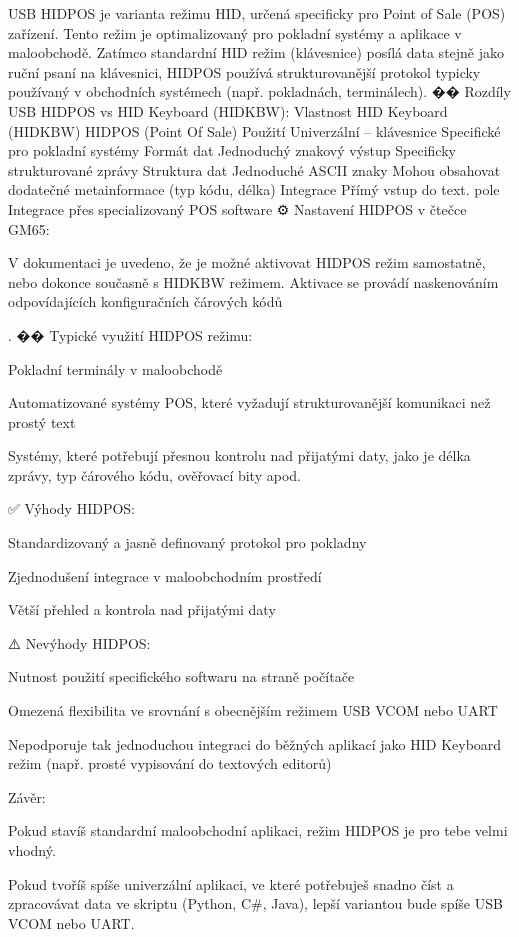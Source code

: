 USB HIDPOS je varianta režimu HID, určená specificky pro Point of Sale (POS) zařízení. Tento režim je optimalizovaný pro pokladní systémy a aplikace v maloobchodě. Zatímco standardní HID režim (klávesnice) posílá data stejně jako ruční psaní na klávesnici, HIDPOS používá strukturovanější protokol typicky používaný v obchodních systémech (např. pokladnách, terminálech).
��️ Rozdíly USB HIDPOS vs HID Keyboard (HIDKBW):
Vlastnost	HID Keyboard (HIDKBW)	HIDPOS (Point Of Sale)
Použití	Univerzální – klávesnice	Specifické pro pokladní systémy
Formát dat	Jednoduchý znakový výstup	Specificky strukturované zprávy
Struktura dat	Jednoduché ASCII znaky	Mohou obsahovat dodatečné metainformace (typ kódu, délka)
Integrace	Přímý vstup do text. pole	Integrace přes specializovaný POS software
⚙️ Nastavení HIDPOS v čtečce GM65:

V dokumentaci je uvedeno, že je možné aktivovat HIDPOS režim samostatně, nebo dokonce současně s HIDKBW režimem. Aktivace se provádí naskenováním odpovídajících konfiguračních čárových kódů​

.
�� Typické využití HIDPOS režimu:

    Pokladní terminály v maloobchodě

    Automatizované systémy POS, které vyžadují strukturovanější komunikaci než prostý text

    Systémy, které potřebují přesnou kontrolu nad přijatými daty, jako je délka zprávy, typ čárového kódu, ověřovací bity apod.

✅ Výhody HIDPOS:

    Standardizovaný a jasně definovaný protokol pro pokladny

    Zjednodušení integrace v maloobchodním prostředí

    Větší přehled a kontrola nad přijatými daty

⚠️ Nevýhody HIDPOS:

    Nutnost použití specifického softwaru na straně počítače

    Omezená flexibilita ve srovnání s obecnějším režimem USB VCOM nebo UART

    Nepodporuje tak jednoduchou integraci do běžných aplikací jako HID Keyboard režim (např. prosté vypisování do textových editorů)

Závěr:

    Pokud stavíš standardní maloobchodní aplikaci, režim HIDPOS je pro tebe velmi vhodný.

    Pokud tvoříš spíše univerzální aplikaci, ve které potřebuješ snadno číst a zpracovávat data ve skriptu (Python, C#, Java), lepší variantou bude spíše USB VCOM nebo UART.

